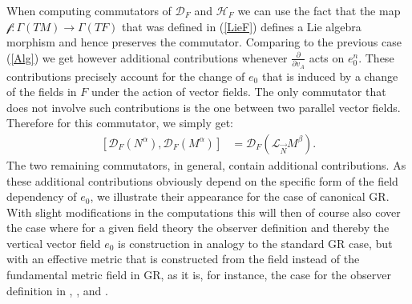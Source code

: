 When computing commutators of $\mathcal{D}_F$ and $\mathcal{H}_F$ we can use the fact that the map $\mathcal{f}: \Gamma(TM) \rightarrow \Gamma(TF)$ that was defined in (\ref{LieF}) defines a Lie algebra morphism and hence preserves the commutator.
Comparing to the previous case (\ref{Alg}) we get however additional contributions whenever $\frac{\partial}{\partial v_A}$ acts on $e_0^n$. These contributions precisely account for the change of $e_0$ that is induced by a change of the fields in $F$ under the action of vector fields. The only commutator that does not involve such contributions is the one between two parallel vector fields. Therefore for this commutator, we simply get:
\begin{align}\label{FDD}
    \left [ \mathcal{D}_F(N^{\alpha}), \mathcal{D}_F(M^{\alpha})\right ] &= \mathcal{D}_F(\mathcal{L}_{\vec{N}}M^{\beta}).
\end{align}
The two remaining commutators, in general, contain additional contributions. As these additional contributions obviously depend on the specific form of the field dependency of $e_0$, we illustrate their appearance for the case of canonical GR. With slight modifications in the computations this will then of course also cover the case where for a given field theory the observer definition and thereby the vertical vector field $e_0$ is construction in analogy to the standard GR case, but with an effective metric that is constructed from the field instead of the fundamental metric field in GR, as it is, for instance, the case for the observer definition in \cite{2018PhRvD..97h4036D}, \cite{2011PhRvD..83d4047R}, and \cite{Rivera}.

